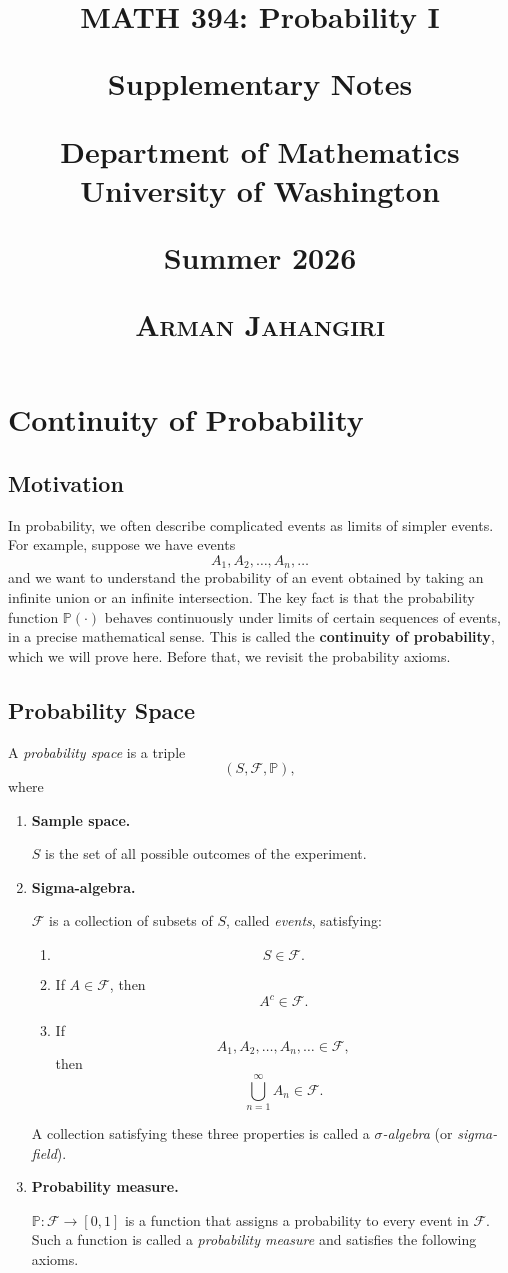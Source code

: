 \documentclass[11pt]{article}
\title{
{\Huge\bfseries MATH 394: Probability I}



\vspace{0.4cm}

{\large Supplementary Notes}


{\Large
Department of Mathematics\\
University of Washington
}

\vspace{0.8cm}

{\large
Summer 2026
}

\vspace{0.8cm}

{\large
\textsc{Arman Jahangiri}
}
}
\author{}
\date{}
\newcommand{\Prob}{\mathbb{P}}
\newcommand{\Sample}{S}
\newcommand{\F}{\mathcal{F}}
\theoremstyle{definition}
\theoremstyle{plain}
\theoremstyle{remark}
\begin{document}
\maketitle

\newpage
\section{Continuity of Probability}

\subsection*{Motivation}

In probability, we often describe complicated events as limits of simpler events. For example, suppose we have events
\[
A_1,A_2,\dots,A_n,\dots
\]
and we want to understand the probability of an event obtained by taking an infinite union or an infinite intersection. The key fact is that the probability function $\mathbb{P}(\cdot)$ behaves continuously under limits of certain sequences of events, in a precise mathematical sense. This is called the \textbf{continuity of probability}, which we will prove here. Before that, we revisit the probability axioms.
\subsection*{Probability Space}

A \emph{probability space} is a triple
\[
(\Sample,\F,\Prob),
\]
where

\begin{enumerate}[label=(\arabic*)]

\item \textbf{Sample space.}

$\Sample$ is the set of all possible outcomes of the experiment.

\item \textbf{Sigma-algebra.}

$\F$ is a collection of subsets of $\Sample$, called \emph{events}, satisfying:

\begin{enumerate}[label=(\alph*)]

\item
\[
\Sample\in\F.
\]

\item
If $A\in\F$, then
\[
A^c\in\F.
\]

\item
If
\[
A_1,A_2,\ldots,A_n,\ldots\in\F,
\]
then
\[
\bigcup_{n=1}^{\infty}A_n\in\F.
\]

\end{enumerate}

A collection satisfying these three properties is called a
\emph{$\sigma$-algebra} (or \emph{sigma-field}).

\item \textbf{Probability measure.}

$\Prob:\F\to[0,1]$ is a function that assigns a probability to every event in $\F$. Such a function is called a
\emph{probability measure} and satisfies the following axioms.

\end{enumerate}
\end{document}
